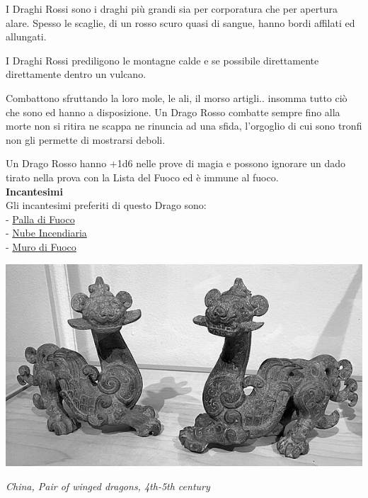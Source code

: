 \begin{multicols}{2}
{I Draghi Rossi sono i draghi più grandi sia per corporatura che per apertura alare.
Spesso le scaglie, di un rosso scuro quasi di sangue, hanno bordi affilati ed allungati.

I Draghi Rossi prediligono le montagne calde e se possibile direttamente direttamente dentro un vulcano.

Combattono sfruttando la loro mole, le ali, il morso artigli.. insomma tutto ciò che sono ed hanno a disposizione. Un Drago Rosso combatte sempre fino alla morte non si ritira ne scappa ne rinuncia ad una sfida, l'orgoglio di cui sono tronfi non gli permette di mostrarsi deboli.

Un Drago Rosso hanno +1d6 nelle prove di magia e possono ignorare un dado tirato nella prova con la Lista del Fuoco ed è immune al fuoco.\\
\textbf{Incantesimi}\\
Gli incantesimi preferiti di questo Drago sono:\\
- \hyperlink{Palla di Fuoco}{Palla di Fuoco}\\
- \hyperlink{Nube Incendiaria}{Nube Incendiaria}\\
- \hyperlink{Muro di Fuoco}{Muro di Fuoco}


\begin{center}
	\includegraphics[width=0.9\linewidth]{immagini/Pair_of_winged_dragons.png}

	\emph{China, Pair of winged dragons, 4th-5th century}
\end{center}

}
\end{multicols}
